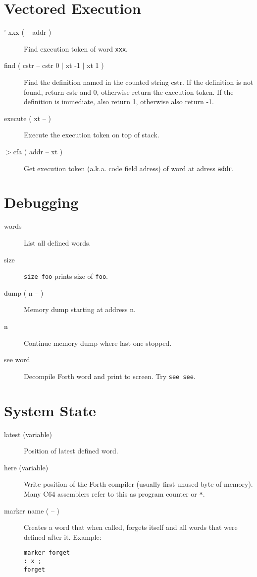 \section{Vectored Execution}

\begin{description}
\item[' xxx ( -- addr )] Find execution token of word \texttt{xxx}.
\item[find ( cstr -- cstr 0 $\vert$ xt -1 $\vert$ xt 1 )] Find the definition named in the counted string cstr. If the definition is not found, return cstr and 0, otherwise return the execution token. If the definition is immediate, also return 1, otherwise also return -1.
\item[execute ( xt -- )] Execute the execution token on top of stack.
\item[$>$cfa ( addr -- xt )] Get execution token (a.k.a. code field adress) of word at adress \texttt{addr}.

\end{description}

\section{Debugging}

\begin{description}
\item[words] List all defined words.
\item[size] \texttt{size foo} prints size of \texttt{foo}.
\item[dump ( n -- )] Memory dump starting at address n.
\item[n] Continue memory dump where last one stopped.
\item[see word] Decompile Forth word and print to screen. Try \texttt{see see}.
\end{description}

\section{System State}

\begin{description}

\item[latest (variable)] Position of latest defined word.

\item[here (variable)] Write position of the Forth compiler (usually first unused byte of memory). Many C64 assemblers refer to this as program counter or \texttt{*}.

\item[marker name ( -- )] Creates a word that when called, forgets itself and all words that were defined after it. Example:

\begin{verbatim}
marker forget
: x ;
forget
\end{verbatim}
\end{description}


